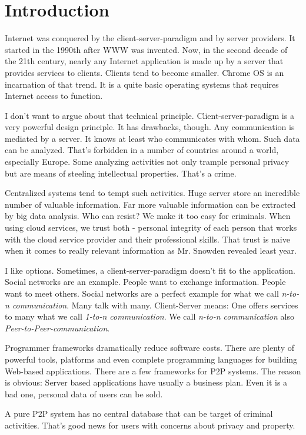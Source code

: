 \chapter{Introduction}
Internet was conquered by the client-server-paradigm and by server providers. It started in the 1990th after WWW was invented. Now, in the second decade of the 21th century, nearly any Internet application is made up by a server that provides services to clients. Clients tend to become smaller. Chrome OS is an incarnation of that trend. It is a quite basic operating systems that requires Internet access to function.

I don't want to argue about that technical principle. Client-server-paradigm is a very powerful design principle. It has drawbacks, though. Any communication is mediated by a server. It knows at least who communicates with whom. Such data can be analyzed. That's forbidden in a number of countries around a world, especially Europe. Some analyzing activities not only trample personal privacy but are means of steeling intellectual properties. That's a crime.

Centralized systems tend to tempt such activities. Huge server store an incredible number of valuable information. Far more valuable information can be extracted by big data analysis. Who can resist? We make it too easy for criminals. When using cloud services, we trust both - personal integrity of each person that works with the cloud service provider and their professional skills. That trust is naive when it comes to really relevant information as Mr. Snowden revealed least year.

I like options. Sometimes, a client-server-paradigm doesn't fit to the application. Social networks are an example. People want to exchange information. People want to meet others. Social networks are a perfect example for what we call {\it n-to-n communication}. Many talk with many. Client-Server means: One offers services to many what we call {\it 1-to-n communication}.
We call {\it n-to-n communication} also {\it Peer-to-Peer-communication}.

Programmer frameworks dramatically reduce software costs. There are plenty of powerful tools, platforms and even complete programming languages for building Web-based applications. There are a few frameworks for P2P systems. The reason is obvious: Server based applications have usually a business plan. Even it is a bad one, personal data of users can be sold.

A pure P2P system has no central database that can be target of criminal activities. That's good news for users with concerns about privacy and property.

